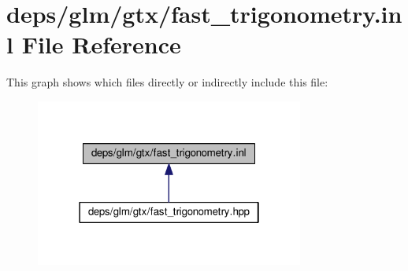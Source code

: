 \hypertarget{fast__trigonometry_8inl}{}\section{deps/glm/gtx/fast\+\_\+trigonometry.inl File Reference}
\label{fast__trigonometry_8inl}
This graph shows which files directly or indirectly include this file\+:
\nopagebreak
\begin{figure}[H]
\begin{center}
\leavevmode
\includegraphics[width=250pt]{d6/d8e/fast__trigonometry_8inl__dep__incl}
\end{center}
\end{figure}
